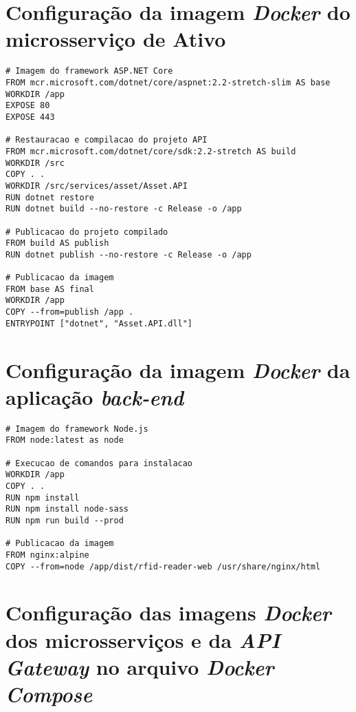 \section{Configuração da imagem \textit{Docker} do microsserviço de Ativo}

\begin{lstlisting}[language=docker, label=docker-servicos]
# Imagem do framework ASP.NET Core
FROM mcr.microsoft.com/dotnet/core/aspnet:2.2-stretch-slim AS base
WORKDIR /app
EXPOSE 80
EXPOSE 443

# Restauracao e compilacao do projeto API
FROM mcr.microsoft.com/dotnet/core/sdk:2.2-stretch AS build
WORKDIR /src
COPY . .
WORKDIR /src/services/asset/Asset.API
RUN dotnet restore
RUN dotnet build --no-restore -c Release -o /app

# Publicacao do projeto compilado
FROM build AS publish
RUN dotnet publish --no-restore -c Release -o /app

# Publicacao da imagem
FROM base AS final
WORKDIR /app
COPY --from=publish /app .
ENTRYPOINT ["dotnet", "Asset.API.dll"]
\end{lstlisting}

\section{Configuração da imagem \textit{Docker} da aplicação \textit{back-end}}

\begin{lstlisting}[language=docker, label=docker-web]
# Imagem do framework Node.js
FROM node:latest as node

# Execucao de comandos para instalacao
WORKDIR /app
COPY . .
RUN npm install
RUN npm install node-sass
RUN npm run build --prod

# Publicacao da imagem
FROM nginx:alpine
COPY --from=node /app/dist/rfid-reader-web /usr/share/nginx/html
\end{lstlisting}

\section{Configuração das imagens \textit{Docker} dos microsserviços e da \textit{API Gateway} no arquivo \textit{Docker Compose}}

